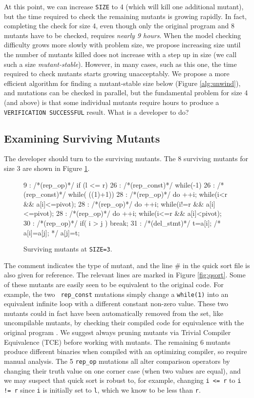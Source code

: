 \documentclass[conference]{IEEEtran}
\begin{document}
At this point, we can increase {\tt SIZE} to 4 (which will kill one
additional mutant), but the time required to check the remaining
mutants is growing rapidly.  In fact, completing the check for size 4,
even though only the original program and 8 mutants have to be
checked, requires \emph{nearly 9 hours}.  When the model checking
difficulty grows more slowly with problem size, we propose increasing
size until the number of mutants killed does not increase with a step
up in size (we call such a size \emph{mutant-stable}).  However, in
many cases, such as this one, the time required to check mutants
starts growing unacceptably.  We propose a more efficient algorithm
for finding a mutant-stable size below (Figure \ref{alg:unwind}), and
mutations can be checked in parallel, but the fundamental problem for
size 4 (and above) is that some individual mutants require hours to
produce a {\tt VERIFICATION SUCCESSFUL} result.  What is a developer
to do?


\subsection{Examining Surviving Mutants}
\label{sec:maxcover}

The developer should turn to the surviving mutants.  The 8 surviving
mutants for size 3 are shown in Figure \ref{fig:survivors}.


\begin{figure}
{\scriptsize
\begin{code}
 9 :   /*(rep\_op)*/ if (l <= r) 
 26 :  /*(rep\_const)*/ while(-1)
 26 :  /*(rep\_const)*/ while( ((1)+1))
 28 :  /*(rep\_op)*/ do ++i; while(i<r \&\& a[i]<=pivot);
 28 :  /*(rep\_op)*/ do ++i; while(i!=r \&\& a[i]<=pivot);
 28 :  /*(rep\_op)*/ do ++i; while(i<=r \&\& a[i]<pivot);
 30 :  /*(rep\_op)*/ if( i > j ) break;
 31 :  /*(del\_stmt)*/ t=a[i]; /*  a[i]=a[j]; */  a[j]=t;
\end{code}
}
\caption{Surviving mutants at {\tt SIZE=3}.}
\label{fig:survivors}
\end{figure}

The comment indicates the type of mutant, and the line \# in the quick
sort file is also given for reference.  The relevant lines are marked
in Figure \ref{fig:qsort}.  Some of these mutants are easily seen to
be equivalent to the original code.  For example, the two {\tt
  rep\_const} mutations simply change a {\tt while(1)} into an
equivalent infinite loop with a different constant non-zero value.
These two mutants could in fact have been automatically removed from
the set, like uncompilable mutants, by checking their compiled code
for equivalence with the original program \cite{TCE}.  We suggest
always pruning mutants via Trivial Compiler Equivalence (TCE) before
working with mutants.  The remaining 6 mutants produce different
binaries when compiled with an optimizing compiler, so require manual
analysis.  The 5 {\tt rep\_op} mutations all alter comparison
operators by changing their truth value on one corner case (when two
values are equal), and we may suspect that quick sort is robust to,
for example, changing {\tt i <= r} to {\tt i != r} since {\tt i} is
initially set to {\tt l}, which we know to be less than {\tt r}.
\end{document}
